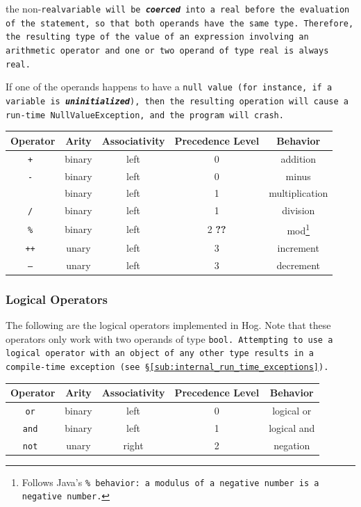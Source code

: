 \documentclass{article}
\begin{document}
the non-\tt real\rm variable will be \textbf{\emph{coerced}} into a \tt real \rm before the evaluation of the statement, so
that both operands have the same type. Therefore, the resulting type of the value of an expression involving an arithmetic
operator and one or two operand of type \tt real \rm is always \tt real\rm.

If one of the operands happens to have a \tt null \rm value (for instance, if a variable is \textbf{\emph{uninitialized}}),
then the resulting operation will cause a run-time \tt NullValueException\rm, and the program will crash.

\begin{center}
\begin{tabular}{|c|c|c|c|c|}

\hline \textbf{Operator} & \textbf{Arity} & \textbf{Associativity} &
\textbf{Precedence Level} & \textbf{Behavior} \\ \hline
\tt + \rm & binary & left & 0 & addition \\ \hline
\tt - \rm & binary & left & 0 & minus \\ \hline
\tt * \rm & binary & left & 1 & multiplication \\ \hline
\tt / \rm & binary & left & 1 & division \\ \hline
\tt \% \rm & binary & left & 2 \textbf{??} & mod\footnote{Follows Java's 
\tt \% \rm behavior: a modulus of a negative number is a negative number.} \\ 
\hline
\tt ++ \rm & unary & left & 3 & increment \\ \hline
\tt -- \rm & unary & left & 3 & decrement \\ \hline
\end{tabular}
\end{center}


\subsubsection{Logical Operators} %
\label{ssub:logical_operators}

The following are the logical operators implemented in Hog. Note that these
operators only work with two operands of type \tt bool\rm. Attempting to use a
logical operator with an object of any other type results in a compile-time
exception (see \S \ref{sub:internal_run_time_exceptions}).

\begin{center}
\begin{tabular}{|c|c|c|c|c|}

\hline \textbf{Operator} & \textbf{Arity} & \textbf{Associativity} &
\textbf{Precedence Level} & \textbf{Behavior} \\ \hline
\tt or \rm & binary & left & 0 & logical or \\ \hline
\tt and \rm & binary & left & 1 & logical and \\ \hline
\tt not \rm & unary & right & 2 & negation \\ \hline
\end{tabular}
\end{center}
\end{document}
